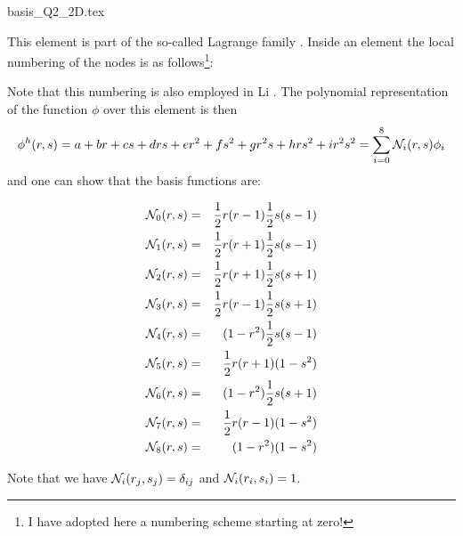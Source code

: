 \begin{flushright} {\tiny {\color{gray} basis\_Q2\_2D.tex}} \end{flushright}

This element is part of the so-called Lagrange family \cite{raki00}. 
Inside an element the local numbering of the nodes is as follows\footnote{I have adopted here 
a numbering scheme starting at zero!}:



Note that this numbering is also employed in Li \cite[p56]{li06}.
The polynomial representation of the function $\phi$ over this element is then
\[
\phi^h(r,s) = a + br + cs + drs + er^2 + fs^2 + gr^2s + hrs^2 + i r^2s^2 = \sum_{i=0}^8 {\mathcal{N}}_i(r,s) \phi_i
\]
and one can show that the basis functions are:
\begin{mdframed}[backgroundcolor=blue!5]
\begin{eqnarray}
{\mathcal{N}}_0(r,s)&=& \frac{1}{2}r(r-1)  \frac{1}{2}s(s-1)\nonumber\\
{\mathcal{N}}_1(r,s)&=& \frac{1}{2}r(r+1)  \frac{1}{2}s(s-1)\nonumber\\
{\mathcal{N}}_2(r,s)&=& \frac{1}{2}r(r+1)  \frac{1}{2}s(s+1)\nonumber\\
{\mathcal{N}}_3(r,s)&=& \frac{1}{2}r(r-1)  \frac{1}{2}s(s+1)\nonumber\\
{\mathcal{N}}_4(r,s)&=&     (1-r^2)  \frac{1}{2}s(s-1)\nonumber\\
{\mathcal{N}}_5(r,s)&=& \frac{1}{2}r(r+1)      (1-s^2)\nonumber\\
{\mathcal{N}}_6(r,s)&=&     (1-r^2)  \frac{1}{2}s(s+1)\nonumber\\
{\mathcal{N}}_7(r,s)&=& \frac{1}{2}r(r-1)      (1-s^2)\nonumber\\
{\mathcal{N}}_8(r,s)&=&     (1-r^2)      (1-s^2)\nonumber
\end{eqnarray}
\end{mdframed}

Note that we have ${\mathcal{N}}_i(r_j,s_j)=\delta_{ij}$ and ${\mathcal{N}}_i(r_i,s_i)=1$. 


